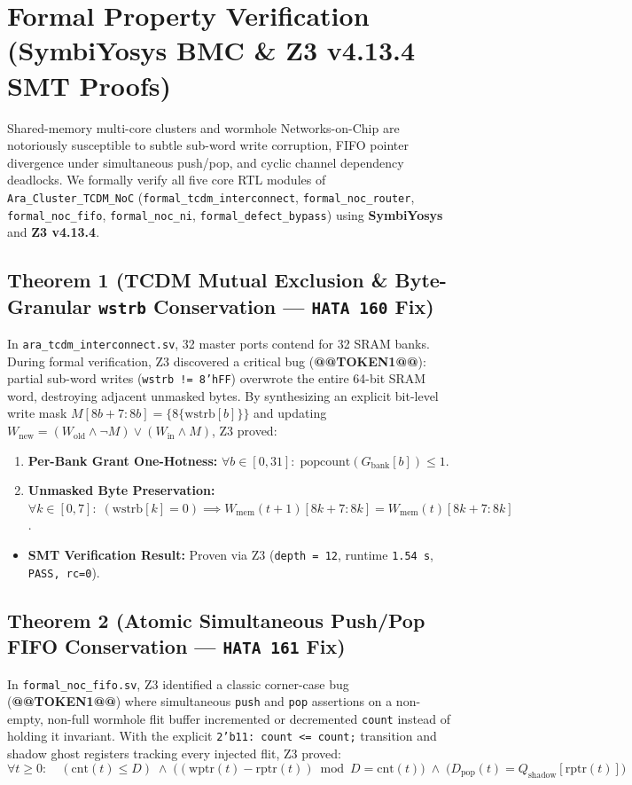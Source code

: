 \documentclass[journal,10pt,twocolumn]{IEEEtran}
\begin{document}
\section{Formal Property Verification (SymbiYosys BMC \& Z3 v4.13.4 SMT Proofs)}

Shared-memory multi-core clusters and wormhole Networks-on-Chip are notoriously susceptible to subtle sub-word write corruption, FIFO pointer divergence under simultaneous push/pop, and cyclic channel dependency deadlocks. We formally verify all five core RTL modules of \texttt{Ara\_Cluster\_TCDM\_NoC} (\texttt{formal\_tcdm\_interconnect}, \texttt{formal\_noc\_router}, \texttt{formal\_noc\_fifo}, \texttt{formal\_noc\_ni}, \texttt{formal\_defect\_bypass}) using \textbf{SymbiYosys} and \textbf{Z3 v4.13.4}.

\subsection{Theorem 1 (TCDM Mutual Exclusion \& Byte-Granular \texttt{wstrb} Conservation — \texttt{HATA 160} Fix)}
In \texttt{ara\_tcdm\_interconnect.sv}, 32 master ports contend for 32 SRAM banks. During formal verification, Z3 discovered a critical bug (\textbf{@@TOKEN1@@}): partial sub-word writes (\texttt{wstrb != 8'hFF}) overwrote the entire 64-bit SRAM word, destroying adjacent unmasked bytes. By synthesizing an explicit bit-level write mask $M[8b+7:8b] = \{8\{\mathrm{wstrb}[b]\}\}$ and updating $W_{\mathrm{new}} = (W_{\mathrm{old}} \wedge \neg M) \vee (W_{\mathrm{in}} \wedge M)$, Z3 proved:
\begin{enumerate}
  \item \textbf{Per-Bank Grant One-Hotness:} $\forall b \in [0,31]:\; \mathrm{popcount}(G_{\mathrm{bank}}[b]) \le 1$.
  \item \textbf{Unmasked Byte Preservation:} $\forall k \in [0,7]:\; (\mathrm{wstrb}[k] = 0) \implies W_{\mathrm{mem}}(t+1)[8k+7:8k] = W_{\mathrm{mem}}(t)[8k+7:8k]$.
\end{enumerate}

\begin{itemize}
  \item \textbf{SMT Verification Result:} Proven via Z3 (\texttt{depth = 12}, runtime \texttt{1.54 s}, \texttt{PASS, rc=0}).
\end{itemize}

\subsection{Theorem 2 (Atomic Simultaneous Push/Pop FIFO Conservation — \texttt{HATA 161} Fix)}
In \texttt{formal\_noc\_fifo.sv}, Z3 identified a classic corner-case bug (\textbf{@@TOKEN1@@}) where simultaneous \texttt{push} and \texttt{pop} assertions on a non-empty, non-full wormhole flit buffer incremented or decremented \texttt{count} instead of holding it invariant. With the explicit \texttt{2'b11: count <= count;} transition and shadow ghost registers tracking every injected flit, Z3 proved:
$$\forall t \ge 0:\quad (\mathrm{cnt}(t) \le D) \;\wedge\; \Big((\mathrm{wptr}(t) - \mathrm{rptr}(t)) \bmod D = \mathrm{cnt}(t)\Big) \;\wedge\; \big(D_{\mathrm{pop}}(t) = Q_{\mathrm{shadow}}[\mathrm{rptr}(t)]\big)$$
\end{document}
